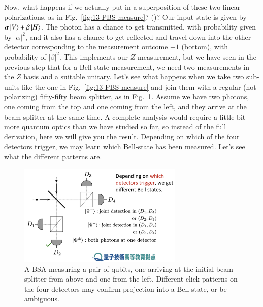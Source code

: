 Now, what happens if we actually put in a superposition of these two linear polarizations, as in Fig.~\ref{fig:13-PBS-measure}? ()? Our input state is given by $\alpha\left| V \right\rangle + \beta \left| H \right\rangle$. The photon has a chance to get transmitted, with probability given by $|\alpha|^2$, and it also has a chance to get reflected and travel down into the other detector corresponding to the measurement outcome $-1$ (bottom), with probability of $|\beta|^2$. This implements our $Z$ measurement, but we have seen in the previous step that for a Bell-state measurement, we need two measurements in the $Z$ basis and a suitable unitary. Let's see what happens when we take two sub-units like the one in Fig.~\ref{fig:13-PBS-measure} and join them with a regular (not polarizing) fifty-fifty beam splitter, as in Fig.~\ref{fig:13-BSA-clicks}. Assume we have two photons, one coming from the top and one coming from the left, and they arrive at the beam splitter at the same time.
A complete analysis would require a little bit more quantum optics than we have studied so far, so instead of the full derivation, here we will give you the result. Depending on which of the four detectors trigger, we may learn which Bell-state has been measured. Let's see what the different patterns are.

\begin{figure}[t]
    \centering
    \includegraphics[width=0.7\textwidth]{lesson13/BSA-clicks.png}
    \caption[A four-detector Bell-state analyzer (BSA)]{A BSA measuring a pair of qubits, one arriving at the initial beam splitter from above and one from the left.  Different click patterns on the four detectors may confirm projection into a Bell state, or be ambiguous.}
    \label{fig:13-BSA-clicks}
\end{figure}

